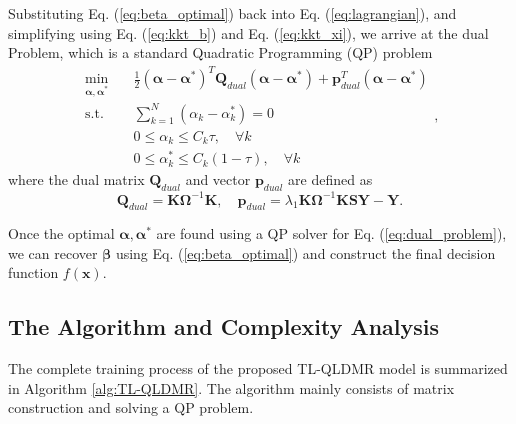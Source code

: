 \documentclass[a4paper]{cas-sc}
\begin{document}
Substituting Eq. (\ref{eq:beta_optimal}) back into Eq. (\ref{eq:lagrangian}), and simplifying using Eq. (\ref{eq:kkt_b}) and Eq. (\ref{eq:kkt_xi}), we arrive at the dual Problem, which is a standard Quadratic Programming (QP) problem
\begin{equation}
\label{eq:dual_problem}
\begin{aligned}
\min_{\boldsymbol{\alpha}, \boldsymbol{\alpha}^*} \quad & \frac{1}{2} (\boldsymbol{\alpha} - \boldsymbol{\alpha}^*)^T \mathbf{Q}_{dual} (\boldsymbol{\alpha} - \boldsymbol{\alpha}^*) + \mathbf{p}_{dual}^T (\boldsymbol{\alpha} - \boldsymbol{\alpha}^*) \\
\text{s.t.} \quad & \sum_{k=1}^N (\alpha_k - \alpha_k^*) = 0 \\
& 0 \le \alpha_k \le C_k \tau, \quad \forall k \\
& 0 \le \alpha_k^* \le C_k (1-\tau), \quad \forall k
\end{aligned},
\end{equation}
where the dual matrix $\mathbf{Q}_{dual}$ and vector $\mathbf{p}_{dual}$ are defined as
\begin{equation}
\label{eq:dual_matrices}
\mathbf{Q}_{dual} = \boldsymbol{K} \boldsymbol{\Omega}^{-1} \boldsymbol{K}, \quad \mathbf{p}_{dual} = \lambda_1 \boldsymbol{K} \boldsymbol{\Omega}^{-1} \boldsymbol{K} \mathbf{S} \boldsymbol{Y} - \boldsymbol{Y}.
\end{equation}

Once the optimal $\boldsymbol{\alpha}, \boldsymbol{\alpha}^*$ are found using a QP solver for Eq. (\ref{eq:dual_problem}), we can recover $\boldsymbol{\beta}$ using Eq. (\ref{eq:beta_optimal}) and construct the final decision function $f(\boldsymbol{x})$.


\subsection{The Algorithm and Complexity Analysis}\label{alg_section}
The complete training process of the proposed TL-QLDMR model is summarized in Algorithm \ref{alg:TL-QLDMR}. The algorithm mainly consists of matrix construction and solving a QP problem.
\end{document}
